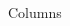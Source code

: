 \documentclass{beamer}
\begin{document}
	
	\begin{frame}{Columns}
		\begin{columns}[T] %
			\begin{column}{0.33\textwidth}
			\end{column}
			\begin{column}{0.33\textwidth}
			\end{column}
			\begin{column}{0.33\textwidth}
			\end{column}
		\end{columns}
	\end{frame}
\end{document}
